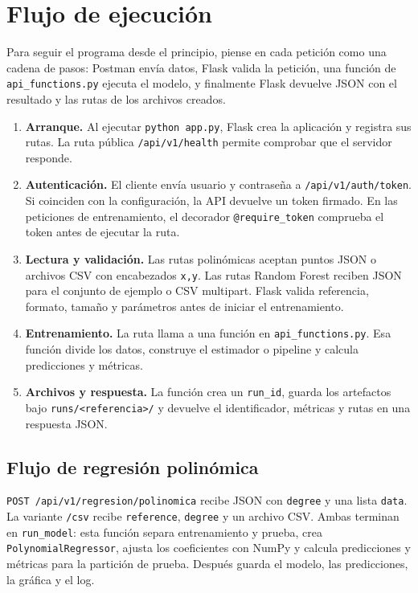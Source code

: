 \documentclass[11pt,a4paper]{article}
\begin{document}
\section{Flujo de ejecución}
Para seguir el programa desde el principio, piense en cada petición como una cadena de pasos: Postman envía datos, Flask valida la petición, una función de \texttt{api\_functions.py} ejecuta el modelo, y finalmente Flask devuelve JSON con el resultado y las rutas de los archivos creados.

\begin{enumerate}
\item \textbf{Arranque.} Al ejecutar \texttt{python app.py}, Flask crea la aplicación y registra sus rutas. La ruta pública \texttt{/api/v1/health} permite comprobar que el servidor responde.
\item \textbf{Autenticación.} El cliente envía usuario y contraseña a \texttt{/api/v1/auth/token}. Si coinciden con la configuración, la API devuelve un token firmado. En las peticiones de entrenamiento, el decorador \texttt{@require\_token} comprueba el token antes de ejecutar la ruta.
\item \textbf{Lectura y validación.} Las rutas polinómicas aceptan puntos JSON o archivos CSV con encabezados \texttt{x,y}. Las rutas Random Forest reciben JSON para el conjunto de ejemplo o CSV multipart. Flask valida referencia, formato, tamaño y parámetros antes de iniciar el entrenamiento.
\item \textbf{Entrenamiento.} La ruta llama a una función en \texttt{api\_functions.py}. Esa función divide los datos, construye el estimador o pipeline y calcula predicciones y métricas.
\item \textbf{Archivos y respuesta.} La función crea un \texttt{run\_id}, guarda los artefactos bajo \texttt{runs/<referencia>/} y devuelve el identificador, métricas y rutas en una respuesta JSON.
\end{enumerate}

\subsection{Flujo de regresión polinómica}
\texttt{POST /api/v1/regresion/polinomica} recibe JSON con \texttt{degree} y una lista \texttt{data}. La variante \texttt{/csv} recibe \texttt{reference}, \texttt{degree} y un archivo CSV. Ambas terminan en \texttt{run\_model}: esta función separa entrenamiento y prueba, crea \texttt{PolynomialRegressor}, ajusta los coeficientes con NumPy y calcula predicciones y métricas para la partición de prueba. Después guarda el modelo, las predicciones, la gráfica y el log.
\end{document}

